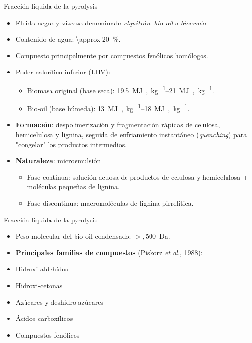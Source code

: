 \documentclass[../../main.tex]{subfiles}
\begin{document}
\begin{frame}{Fracción líquida de la pyrolysis}
\begin{itemize}
\item Fluido negro y viscoso denominado \emph{alquitrán}, \emph{bio‑oil} o \emph{biocrudo}.
\item Contenido de agua: \SI{\approx 20}{\percent}.
\item Compuesto principalmente por compuestos fenólicos homólogos.
\item Poder calorífico inferior (LHV):
\begin{itemize}
\item Biomasa original (base seca): \SIrange{19.5}{21}{MJ,kg^{-1}}.
\item Bio‑oil (base húmeda): \SIrange{13}{18}{MJ,kg^{-1}}.
\end{itemize}
\item \textbf{Formación}: despolimerización y fragmentación rápidas de celulosa, hemicelulosa y lignina, seguida de enfriamiento instantáneo (\emph{quenching}) para "congelar" los productos intermedios.
\item \textbf{Naturaleza}: microemulsión
\begin{itemize}
\item Fase continua: solución acuosa de productos de celulosa y hemicelulosa + moléculas pequeñas de lignina.
\item Fase discontinua: macromoléculas de lignina pirrolítica.
\end{itemize}
\end{itemize}
\end{frame}

\begin{frame}{Fracción líquida de la pyrolysis}
\begin{itemize}
     \item Peso molecular del bio‑oil condensado: $>,500$~Da.
\item \textbf{Principales familias de compuestos} (Piskorz \emph{et al.}, 1988):
\end{itemize}
\begin{itemize}
\item Hidroxi‑aldehídos
\item Hidroxi‑cetonas
\item Azúcares y deshidro‑azúcares
\item Ácidos carboxílicos
\item Compuestos fenólicos
\end{itemize}
\end{frame}
\end{document}

